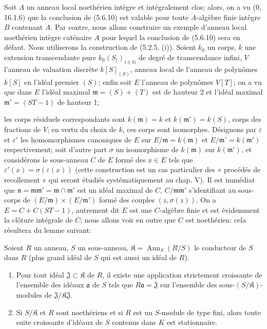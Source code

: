\begin{example}[5.6.11]
\label{IV.2.s5.6.11-fr}
Soit $A$ un anneau local noethérien intègre et intégralement clos; alors, on
a vu (0, 16.1.6) que la conclusion de (5.6.10) est valable pour toute
$A$-algèbre finie intègre $B$ contenant $A$. Par contre, nous allons
construire un exemple d'anneau local noethérien intègre caténaire $A$ pour
lequel la conclusion de (5.6.10) sera en défaut. Nous utiliserons la
construction de (5.2.5, (i)). Soient $k_0$ un corps, $k$ une extension
transcendante pure $k_0(S_i)_{i\in\mathbb N}$ de degré de transcendance
infini, $V$ l'anneau de valuation discrète $k[S]_{(S)}$, anneau local de
l'anneau de polynômes $k[S]$ en l'idéal premier $(S)$; enfin soit $E$
l'anneau de polynômes $V[T]$; on a vu que dans $E$ l'idéal maximal
$\mathfrak m=(S)+(T)$ est de hauteur 2 et l'idéal maximal
$\mathfrak m'=(ST-1)$ de hauteur 1;


les corps résiduels correspondants sont $k(\mathfrak m)=k$ et
$k(\mathfrak m')=k(S)$, corps des fractions de $V$; en vertu du choix de
$k$, ces corps sont isomorphes. Désignons par $\varepsilon$ et
$\varepsilon'$ les homomorphismes canoniques de $E$ sur
$E/\mathfrak m=k(\mathfrak m)$ et $E/\mathfrak m'=k(\mathfrak m')$
respectivement; soit d'autre part $\sigma$ un isomorphisme de
$k(\mathfrak m)$ sur $k(\mathfrak m')$, et considérons le sous-anneau $C$
de $E$ formé des $x\in E$ tels que
$\varepsilon'(x)=\sigma(\varepsilon(x))$ (cette construction est un cas
particulier des « procédés de recollement » qui seront étudiés
systématiquement au chap. V). Il est immédiat que
$\mathfrak n=\mathfrak m\mathfrak m'=\mathfrak m\cap\mathfrak m'$ est un
idéal maximal de $C$, $C/\mathfrak m\mathfrak m'$ s'identifiant au
sous-corps de $(E/\mathfrak m)\times(E/\mathfrak m')$ formé des couples
$(z,\sigma(z))$. On a $E=C+C(ST-1)$, autrement dit $E$ est une
$C$-algèbre finie et est évidemment la clôture intégrale de $C$; nous allons
voir en outre que $C$ est noethérien: cela résultera du lemme suivant:

\begin{lemma}[5.6.11.1]
\label{IV.2.s5.6.11.1-fr}
Soient $R$ un anneau, $S$ un sous-anneau,
$\mathfrak K=\operatorname{Ann}_S(R/S)$ le conducteur de $S$ dans $R$
(plus grand idéal de $S$ qui est aussi un idéal de $R$).
\begin{enumerate}
\item[(i)] Pour tout idéal $\mathfrak J\subset\mathfrak K$ de $R$, il existe
une application strictement croissante de l'ensemble des idéaux
$\mathfrak a$ de $S$ tels que $R\mathfrak a=\mathfrak J$ sur l'ensemble des
sous-$(S/\mathfrak K)$-modules de
$\mathfrak J/\mathfrak K\mathfrak J$.
\item[(ii)] Si $S/\mathfrak K$ et $R$ sont noethériens et si $R$ est un
$S$-module de type fini, alors toute suite croissante d'idéaux de $S$
contenus dans $K$ est stationnaire.
\end{enumerate}
\end{lemma}


\end{example}

